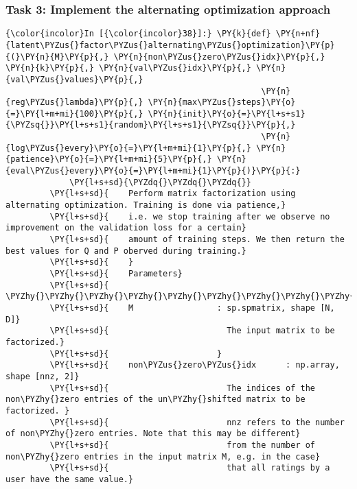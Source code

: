     \hypertarget{task-3-implement-the-alternating-optimization-approach}{%
\subsubsection{Task 3: Implement the alternating optimization
approach}\label{task-3-implement-the-alternating-optimization-approach}}

    \begin{Verbatim}[commandchars=\\\{\}]
{\color{incolor}In [{\color{incolor}38}]:} \PY{k}{def} \PY{n+nf}{latent\PYZus{}factor\PYZus{}alternating\PYZus{}optimization}\PY{p}{(}\PY{n}{M}\PY{p}{,} \PY{n}{non\PYZus{}zero\PYZus{}idx}\PY{p}{,} \PY{n}{k}\PY{p}{,} \PY{n}{val\PYZus{}idx}\PY{p}{,} \PY{n}{val\PYZus{}values}\PY{p}{,}
                                                    \PY{n}{reg\PYZus{}lambda}\PY{p}{,} \PY{n}{max\PYZus{}steps}\PY{o}{=}\PY{l+m+mi}{100}\PY{p}{,} \PY{n}{init}\PY{o}{=}\PY{l+s+s1}{\PYZsq{}}\PY{l+s+s1}{random}\PY{l+s+s1}{\PYZsq{}}\PY{p}{,}
                                                    \PY{n}{log\PYZus{}every}\PY{o}{=}\PY{l+m+mi}{1}\PY{p}{,} \PY{n}{patience}\PY{o}{=}\PY{l+m+mi}{5}\PY{p}{,} \PY{n}{eval\PYZus{}every}\PY{o}{=}\PY{l+m+mi}{1}\PY{p}{)}\PY{p}{:}
             \PY{l+s+sd}{\PYZdq{}\PYZdq{}\PYZdq{}}
         \PY{l+s+sd}{    Perform matrix factorization using alternating optimization. Training is done via patience,}
         \PY{l+s+sd}{    i.e. we stop training after we observe no improvement on the validation loss for a certain}
         \PY{l+s+sd}{    amount of training steps. We then return the best values for Q and P oberved during training.}
         \PY{l+s+sd}{    }
         \PY{l+s+sd}{    Parameters}
         \PY{l+s+sd}{    \PYZhy{}\PYZhy{}\PYZhy{}\PYZhy{}\PYZhy{}\PYZhy{}\PYZhy{}\PYZhy{}\PYZhy{}\PYZhy{}}
         \PY{l+s+sd}{    M                 : sp.spmatrix, shape [N, D]}
         \PY{l+s+sd}{                        The input matrix to be factorized.}
         \PY{l+s+sd}{                      }
         \PY{l+s+sd}{    non\PYZus{}zero\PYZus{}idx      : np.array, shape [nnz, 2]}
         \PY{l+s+sd}{                        The indices of the non\PYZhy{}zero entries of the un\PYZhy{}shifted matrix to be factorized. }
         \PY{l+s+sd}{                        nnz refers to the number of non\PYZhy{}zero entries. Note that this may be different}
         \PY{l+s+sd}{                        from the number of non\PYZhy{}zero entries in the input matrix M, e.g. in the case}
         \PY{l+s+sd}{                        that all ratings by a user have the same value.}

\end{Verbatim}
